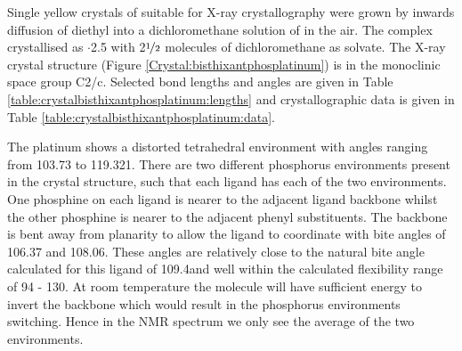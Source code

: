Single yellow crystals of  suitable for X-ray crystallography were grown by inwards diffusion of diethyl into a dichloromethane solution of  in the air.    The complex crystallised as \ce{[Pt(thixantphos)2]}$\cdot$2.5  with 2$\nicefrac{1}{2}$ molecules of dichloromethane as solvate.  The X-ray crystal structure (Figure \ref{Crystal:bisthixantphosplatinum}) is in the monoclinic space group C2/c.  Selected bond lengths and angles are given in Table \ref{table:crystalbisthixantphosplatinum:lengths} and crystallographic data is given in Table \ref{table:crystalbisthixantphosplatinum:data}. 

The platinum shows a distorted tetrahedral environment with angles ranging from 103.73 to 119.321\degrees.  There are two different phosphorus environments present in the crystal structure, such that each ligand has each of the two environments.  One phosphine on each ligand is nearer to the adjacent ligand backbone whilst the other phosphine is nearer to the adjacent phenyl substituents.  The backbone is bent away from planarity to allow the ligand to coordinate with bite angles of 106.37 and 108.06\degrees. These angles are relatively close to the natural bite angle calculated for this ligand of 109.4\degrees and well within the calculated flexibility range of 94 - 130\degrees.  At room temperature the molecule will have sufficient energy to invert the backbone which would result in the phosphorus environments switching.  Hence in the \phosphorus{} NMR spectrum we only see the average of the two environments.  


